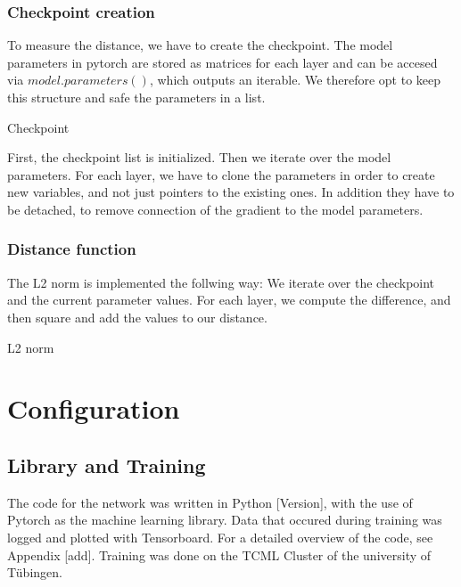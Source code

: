 \subsubsection{Checkpoint creation}
To measure the distance, we have to create the checkpoint. The model parameters
in pytorch are stored as matrices for each layer and can be accesed via
$model.parameters()$, which outputs an iterable. We therefore opt to keep this
structure and safe the parameters in a list.
\begin{algorithm}[htbp]
    \caption{Checkpoint}\label{alg:Checkpoint}
    \lstset{language=Python}
    
\end{algorithm}
\newline
First, the checkpoint list is initialized. Then we iterate over the model
parameters. For each layer, we have to clone the parameters in order to create
new variables, and not just pointers to the existing ones. In addition they have
to be detached, to remove connection of the gradient to the model parameters.

\subsubsection{Distance function}
The L2 norm is implemented the follwing way: We iterate over the checkpoint and
the current parameter values. For each layer, we compute the difference, and
then square and add the values to our distance.
\begin{algorithm}[htbp]
    \caption{L2 norm}\label{alg:L2Norm}
    \lstset{language=Python}
    
\end{algorithm}



\section{Configuration}

\subsection{Library and Training}
The code for the network was written in Python [Version], with the use of
Pytorch \cite{NEURIPS2019_9015} as the machine learning library. Data that occured during training was
logged and plotted with Tensorboard. For a detailed overview of the code, see
Appendix [add]. Training was done on the TCML Cluster of the university of Tübingen.

